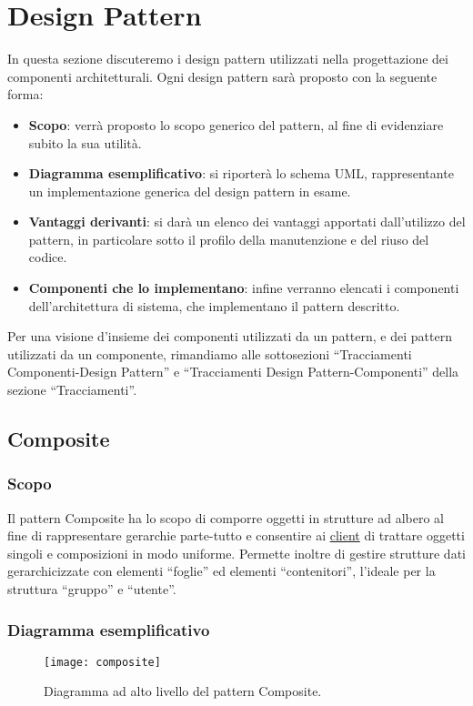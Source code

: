 \section{Design Pattern}
In questa sezione discuteremo i design pattern utilizzati nella progettazione dei componenti architetturali. Ogni design pattern sarà proposto con la seguente forma:
\begin{itemize}
	\item \textbf{Scopo}: verrà proposto lo scopo generico del pattern, al fine di evidenziare subito la sua utilità.
	\item \textbf{Diagramma esemplificativo}: si riporterà lo schema UML, rappresentante un implementazione generica del design pattern in esame.
	\item \textbf{Vantaggi derivanti}: si darà un elenco dei vantaggi apportati dall'utilizzo del pattern, in particolare sotto il profilo della manutenzione e del riuso del codice.
	\item \textbf{Componenti che lo implementano}: infine verranno elencati i componenti dell'architettura di sistema, che implementano il pattern descritto.
\end{itemize}

Per una visione d'insieme dei componenti utilizzati da un pattern, e dei pattern utilizzati da un componente, rimandiamo alle sottosezioni ``Tracciamenti Componenti-Design Pattern'' e ``Tracciamenti Design Pattern-Componenti'' della sezione ``Tracciamenti''.

\subsection{Composite}

\subsubsection{Scopo}
Il pattern Composite ha lo scopo di comporre oggetti in strutture ad albero al fine di rappresentare gerarchie parte-tutto e consentire ai \underline{client} di trattare oggetti singoli e composizioni in modo uniforme. Permette inoltre di gestire strutture dati gerarchicizzate con elementi ``foglie'' ed elementi ``contenitori'', l'ideale per la struttura ``gruppo'' e ``utente''.

\subsubsection{Diagramma esemplificativo}
\begin{figure}[H]
\centering
\texttt{[image: composite]}
\caption{Diagramma ad alto livello del pattern Composite.}\label{fig:composite}
\end{figure}

